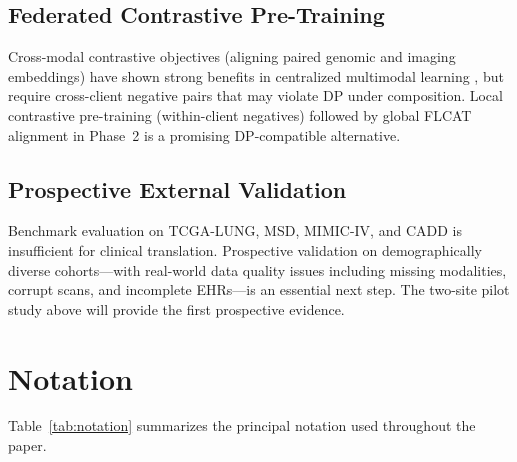 \documentclass[a4paper,fleqn]{cas-dc}
\begin{document}
\subsection{Federated Contrastive Pre-Training}
Cross-modal contrastive objectives (aligning paired genomic and imaging embeddings) have shown strong benefits in centralized multimodal learning \citep{huang2021multimodal}, but require cross-client negative pairs that may violate DP under composition. Local contrastive pre-training (within-client negatives) followed by global FLCAT alignment in Phase~2 is a promising DP-compatible alternative.

\subsection{Prospective External Validation}
Benchmark evaluation on TCGA-LUNG, MSD, MIMIC-IV, and CADD is insufficient for clinical translation. Prospective validation on demographically diverse cohorts---with real-world data quality issues including missing modalities, corrupt scans, and incomplete EHRs---is an essential next step. The two-site pilot study above will provide the first prospective evidence.

\section{Notation}
\label{sec:notation}

Table~\ref{tab:notation} summarizes the principal notation used throughout the paper.
\end{document}
